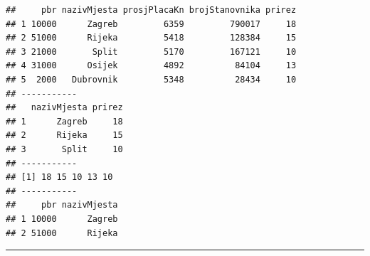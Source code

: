 \documentclass[]{book}
\newenvironment{Shaded}{\begin{snugshade}}{\end{snugshade}}
\newcommand{\KeywordTok}[1]{\textcolor[rgb]{0.13,0.29,0.53}{\textbf{#1}}}
\newcommand{\DecValTok}[1]{\textcolor[rgb]{0.00,0.00,0.81}{#1}}
\newcommand{\CharTok}[1]{\textcolor[rgb]{0.31,0.60,0.02}{#1}}
\newcommand{\StringTok}[1]{\textcolor[rgb]{0.31,0.60,0.02}{#1}}
\newcommand{\CommentTok}[1]{\textcolor[rgb]{0.56,0.35,0.01}{\textit{#1}}}
\newcommand{\OperatorTok}[1]{\textcolor[rgb]{0.81,0.36,0.00}{\textbf{#1}}}
\newcommand{\NormalTok}[1]{#1}
\theoremstyle{definition}
\theoremstyle{definition}
\theoremstyle{definition}
\theoremstyle{remark}
\begin{document}
\begin{Shaded}
\end{Shaded}

\begin{verbatim}
##     pbr nazivMjesta prosjPlacaKn brojStanovnika prirez
## 1 10000      Zagreb         6359         790017     18
## 2 51000      Rijeka         5418         128384     15
## 3 21000       Split         5170         167121     10
## 4 31000      Osijek         4892          84104     13
## 5  2000   Dubrovnik         5348          28434     10
## -----------
##   nazivMjesta prirez
## 1      Zagreb     18
## 2      Rijeka     15
## 3       Split     10
## -----------
## [1] 18 15 10 13 10
## -----------
##     pbr nazivMjesta
## 1 10000      Zagreb
## 2 51000      Rijeka
\end{verbatim}

\begin{center}\rule{0.5\linewidth}{\linethickness}\end{center}
\end{document}
